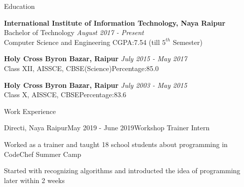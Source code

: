 \documentclass{resume} %
\begin{document}
\newcommand\myshade{85}

\begin{rSection}{Education}

{\bf International Institute of Information Technology, Naya Raipur}  \\
Bachelor of Technology \hfill {\em August 2017 - Present}
\\
Computer Science and Engineering \hfill{CGPA:7.54 (till $5^{th}$ Semester) }

{\bf Holy Cross Byron Bazar, Raipur} \hfill {\em July 2015 - May 2017} \\
Class XII, AISSCE, CBSE(Science)\hfill {Percentage:85.0} 

{\bf Holy Cross Byron Bazar, Raipur} \hfill {\em July 2003 - May 2015} \\ 
Class X, AISSCE, CBSE\hfill {Percentage:83.6}
\end{rSection}
\begin{rSection}{Work Experience}

\begin{rSubsection}{Directi, Naya Raipur}{May 2019 - June 2019}{Workshop Trainer Intern}{}
\item Worked as a trainer and taught 18 school students
about programming in CodeChef Summer Camp
\item Started with recognizing algorithms and introducted the idea of programming later within 2 weeks
\end{rSubsection}


\end{rSection}
\end{document}
